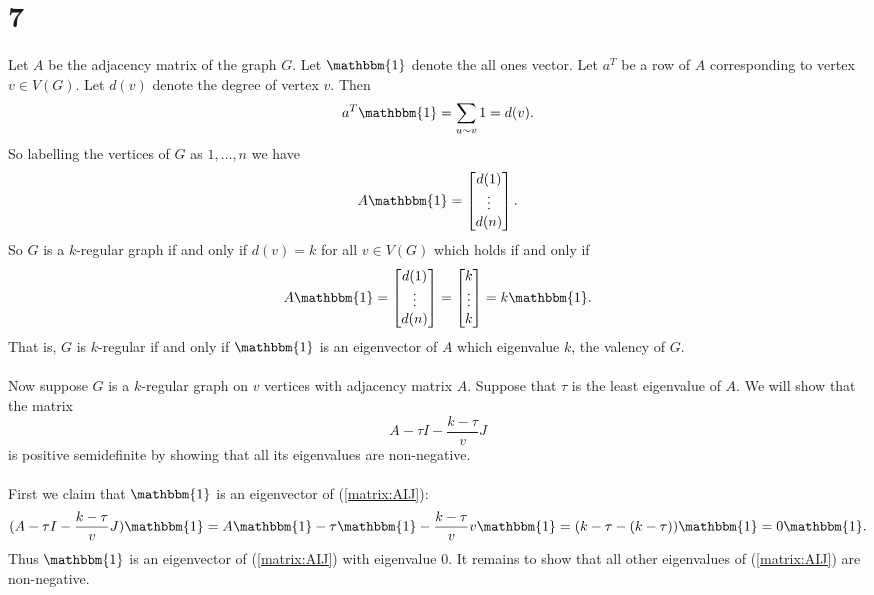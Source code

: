 \documentclass[letterpaper,12pt,oneside,onecolumn]{article}
\newcommand{\1}{\mathbbm{1}}
\begin{document}
\section*{7}
\paragraph{}
Let $A$ be the adjacency matrix of the graph $G$.  Let $\1$ denote the all ones vector. Let $a^T$ be a row of $A$ corresponding to vertex $v \in V(G)$. Let $d(v)$ denote the degree of vertex $v$. Then
$$a^T\1 = \sum_{u \sim v} 1 = d(v).$$
So labelling the vertices of $G$ as $1, \dots, n$ we have
$$A\1 = \begin{bmatrix} d(1) \\ \vdots \\ d(n)\end{bmatrix}.$$
So $G$ is a $k$-regular graph if and only if $d(v) = k$ for all $v \in V(G)$ which holds if and only if
$$ A\1 = \begin{bmatrix} d(1) \\ \vdots \\ d(n)\end{bmatrix} = \begin{bmatrix} k \\ \vdots \\ k \end{bmatrix} = k \1.$$
That is, $G$ is $k$-regular if and only if $\1$ is an eigenvector of $A$ which eigenvalue $k$, the valency of $G$.
\paragraph{}
Now suppose $G$ is a $k$-regular graph on $v$ vertices with adjacency matrix $A$. Suppose that $\tau$ is the least eigenvalue of $A$. We will show that the matrix
\begin{equation}
A - \tau I - \frac{k - \tau}{v} J \label{matrix:AIJ}
\end{equation}
is positive semidefinite by showing that all its eigenvalues are non-negative.
\paragraph{}
First we claim that $\1$ is an eigenvector of (\ref{matrix:AIJ}):
$$(A - \tau I - \frac{k - \tau}{v} J)\1 = A\1 - \tau \1 - \frac{k-\tau}{v}v\1 = (k-\tau - (k-\tau))\1 = 0 \1 .$$
Thus $\1$ is an eigenvector of (\ref{matrix:AIJ}) with eigenvalue $0$. It remains to show that all other eigenvalues of (\ref{matrix:AIJ}) are non-negative. 
\end{document}
